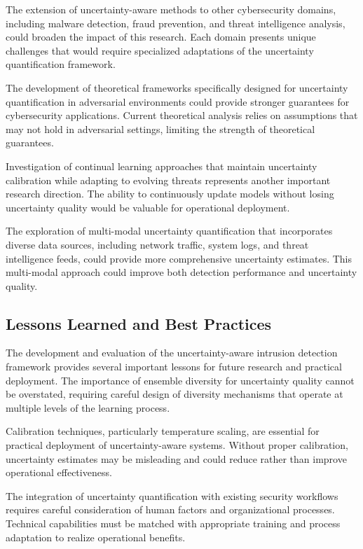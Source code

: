 \documentclass[journal]{IEEEtran}
\begin{document}
The extension of uncertainty-aware methods to other cybersecurity domains, including malware detection, fraud prevention, and threat intelligence analysis, could broaden the impact of this research. Each domain presents unique challenges that would require specialized adaptations of the uncertainty quantification framework.

The development of theoretical frameworks specifically designed for uncertainty quantification in adversarial environments could provide stronger guarantees for cybersecurity applications. Current theoretical analysis relies on assumptions that may not hold in adversarial settings, limiting the strength of theoretical guarantees.

Investigation of continual learning approaches that maintain uncertainty calibration while adapting to evolving threats represents another important research direction. The ability to continuously update models without losing uncertainty quality would be valuable for operational deployment.

The exploration of multi-modal uncertainty quantification that incorporates diverse data sources, including network traffic, system logs, and threat intelligence feeds, could provide more comprehensive uncertainty estimates. This multi-modal approach could improve both detection performance and uncertainty quality.

\subsection{Lessons Learned and Best Practices}

The development and evaluation of the uncertainty-aware intrusion detection framework provides several important lessons for future research and practical deployment. The importance of ensemble diversity for uncertainty quality cannot be overstated, requiring careful design of diversity mechanisms that operate at multiple levels of the learning process.

Calibration techniques, particularly temperature scaling, are essential for practical deployment of uncertainty-aware systems. Without proper calibration, uncertainty estimates may be misleading and could reduce rather than improve operational effectiveness.

The integration of uncertainty quantification with existing security workflows requires careful consideration of human factors and organizational processes. Technical capabilities must be matched with appropriate training and process adaptation to realize operational benefits.
\end{document}
